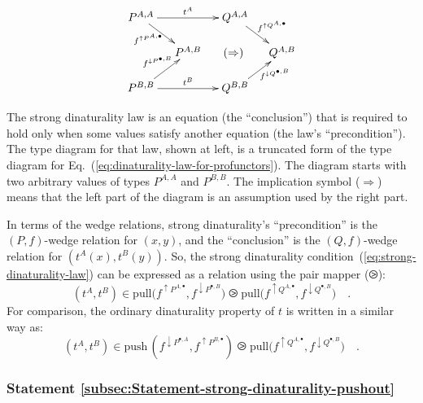 \begin{wrapfigure}{l}{0.32\columnwidth}%
\vspace{-2.5\baselineskip}
\[
\xymatrix{\xyScaleY{1.2pc}\xyScaleX{1.0pc}P^{A,A}\ar[rd]\sb(0.35){f^{\uparrow P^{A,\bullet}}\negthickspace\negthickspace}\ar[rr]\sp(0.5){t^{A}} &  & Q^{A,A}\ar[rd]\sp(0.5){f^{\uparrow Q^{A,\bullet}}}\\
 & P^{A,B} & \negthickspace(\Rightarrow) & Q^{A,B}\\
P^{B,B}\ar[ru]\sp(0.5){f^{\downarrow P^{\bullet,B}}\negthickspace\negthickspace\negthickspace}\ar[rr]\sp(0.5){t^{B}} &  & Q^{B,B}\ar[ru]\sb(0.65){\negthickspace\negthickspace f^{\downarrow Q^{\bullet,B}}}
}
\]
\vspace{-2\baselineskip}
\end{wrapfigure}%

\noindent The strong dinaturality law is an equation (the \textsf{``}conclusion\textsf{''})
that is required to hold only when some values satisfy another equation
(the law\textsf{'}s \textsf{``}precondition\textsf{''}). The type diagram for that law, shown
at left, is a truncated form of the type diagram for Eq.~(\ref{eq:dinaturality-law-for-profunctors}).
The diagram starts with two arbitrary values of types $P^{A,A}$ and
$P^{B,B}$. The implication symbol ($\Rightarrow$) means that the
left part of the diagram is an assumption used by the right part.

In terms of the wedge relations, strong dinaturality\textsf{'}s \textsf{``}precondition\textsf{''}
is the $\left(P,f\right)$-wedge relation for $(x,y)$, and the \textsf{``}conclusion\textsf{''}
is the $\left(Q,f\right)$-wedge relation for $(t^{A}(x),t^{B}(y))$.
So, the strong dinaturality condition~(\ref{eq:strong-dinaturality-law})
can be expressed as a relation using the pair mapper ($\ogreaterthan$):
\[
(t^{A},t^{B})\in\text{pull}\big(f^{\uparrow P^{A,\bullet}},f^{\downarrow P^{\bullet,B}}\big)\ogreaterthan\text{pull}\big(f^{\uparrow Q^{A,\bullet}},f^{\downarrow Q^{\bullet,B}}\big)\quad.
\]
For comparison, the ordinary dinaturality property of $t$ is written
in a similar way as:
\[
(t^{A},t^{B})\in\text{push}\,(f^{\downarrow P^{\bullet,A}},f^{\uparrow P^{B,\bullet}})\ogreaterthan\text{pull}\big(f^{\uparrow Q^{A,\bullet}},f^{\downarrow Q^{\bullet,B}}\big)\quad.
\]


\subsubsection{Statement \label{subsec:Statement-strong-dinaturality-pushout}\ref{subsec:Statement-strong-dinaturality-pushout}}

